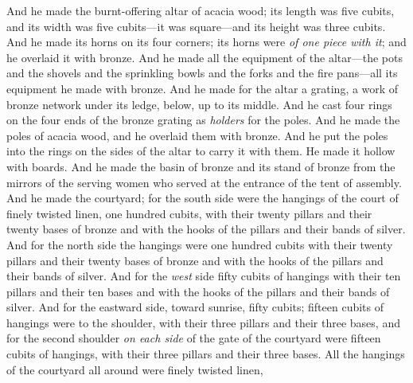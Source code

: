 \begin{biblechapter} %
 And he made the burnt-offering altar of acacia wood; its length was five cubits, and its width was five cubits—it was square—and its height was three cubits.
\verse And he made its horns on its four corners; its horns were \textit{of one piece with it}; and he overlaid it with bronze.
\verse And he made all the equipment of the altar—the pots and the shovels and the sprinkling bowls and the forks and the fire pans—all its equipment he made with bronze.
\verse And he made for the altar a grating, a work of bronze network under its ledge, below, up to its middle.
\verse And he cast four rings on the four ends of the bronze grating as \textit{holders} for the poles.
\verse And he made the poles of acacia wood, and he overlaid them with bronze.
\verse And he put the poles into the rings on the sides of the altar to carry it with them. He made it hollow with boards.
\verse And he made the basin of bronze and its stand of bronze from the mirrors of the serving women who served at the entrance of the tent of assembly.
 And he made the courtyard; for the south side were the hangings of the court of finely twisted linen, one hundred cubits,
\verse with their twenty pillars and their twenty bases of bronze and with the hooks of the pillars and their bands of silver.
\verse And for the north side the hangings were one hundred cubits with their twenty pillars and their twenty bases of bronze and with the hooks of the pillars and their bands of silver.
\verse And for the \textit{west} side fifty cubits of hangings with their ten pillars and their ten bases and with the hooks of the pillars and their bands of silver.
\verse And for the eastward side, toward sunrise, fifty cubits;
\verse fifteen cubits of hangings were to the shoulder, with their three pillars and their three bases,
\verse and for the second shoulder \textit{on each side} of the gate of the courtyard were fifteen cubits of hangings, with their three pillars and their three bases.
\verse All the hangings of the courtyard all around were finely twisted linen,

\end{biblechapter}

